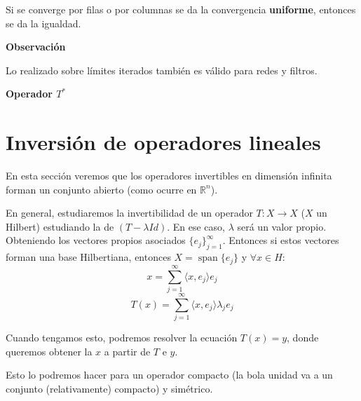 \documentclass[openany]{book}
\begin{document}
\begin{theorem}
    Si se converge por filas o por columnas se da la convergencia \textbf{uniforme}, entonces se da la igualdad.
\end{theorem}


\begin{flushright}
    \textbf{Observación}
\end{flushright}

Lo realizado sobre límites iterados también es válido para redes y filtros.

\begin{definition}
    \textbf{Operador $ T^*$}

\end{definition}

\section{Inversión de operadores lineales}

En esta sección veremos que los operadores invertibles en dimensión infinita forman un conjunto abierto (como ocurre en $ \mathbb{R}^{n}$). 

En general, estudiaremos la invertibilidad de un operador $ T: X \to X$ ($ X$ un Hilbert) estudiando la de $ (T- \lambda  Id)$. En ese caso, $ \lambda $ será un valor propio. Obteniendo los vectores propios asociados $ \{e_j\}_{j=1}^{\infty}$. Entonces si estos vectores forman una base Hilbertiana, entonces $ X = \operatorname{span} \{e_j\}$ y $ \forall x \in H$:
$$ x = \sum\limits_{j=1}^{\infty} \langle x, e_j \rangle e_j  $$
$$ T(x) = \sum\limits_{j=1}^{ \infty} \langle x, e_j \rangle \lambda_j e_j $$

Cuando tengamos esto, podremos resolver la ecuación $ T(x) = y$, donde queremos obtener la $ x$ a partir de $ T $ e $ y$.

Esto lo podremos hacer para un operador compacto (la bola unidad va a un conjunto (relativamente) compacto) y simétrico.
\end{document}
